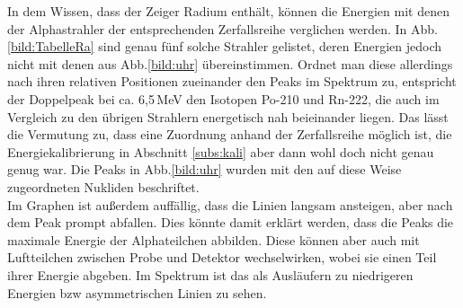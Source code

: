In dem Wissen, dass der Zeiger Radium enthält, können die Energien mit denen der Alphastrahler der entsprechenden Zerfallsreihe verglichen werden. In Abb.\ref{bild:TabelleRa}
sind genau fünf solche Strahler gelistet, deren Energien jedoch nicht mit denen aus Abb.\ref{bild:uhr} übereinstimmen. Ordnet man diese allerdings nach ihren relativen Positionen 
zueinander den Peaks im Spektrum zu, entspricht der Doppelpeak bei ca. 6,5\,MeV den Isotopen Po-210 und Rn-222, die auch im Vergleich zu den übrigen Strahlern energetisch nah 
beieinander liegen. Das lässt die Vermutung zu, dass eine Zuordnung anhand der Zerfallsreihe möglich ist, die Energiekalibrierung in Abschnitt \ref{subs:kali} aber dann 
wohl doch nicht genau genug war. Die Peaks in Abb.\ref{bild:uhr} wurden mit den auf diese Weise zugeordneten Nukliden beschriftet.\\

Im Graphen ist außerdem auffällig, dass die Linien langsam ansteigen, aber nach dem Peak prompt abfallen. Dies könnte damit erklärt werden, dass 
die Peaks die maximale Energie der Alphateilchen abbilden. Diese können aber auch mit Luftteilchen zwischen Probe und Detektor wechselwirken, wobei 
sie einen Teil ihrer Energie abgeben. Im Spektrum ist das als Ausläufern zu niedrigeren Energien bzw asymmetrischen Linien zu sehen. \\
